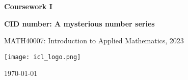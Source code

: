 \documentclass[10pt, a4paper]{article}
\begin{document}
\begin{titlepage}
    \begin{center}
        \vspace*{3cm}
            
        \Huge
        \textbf{
        Coursework I}
            
            
        \vspace{1.5cm}
        \Large
            
        \textbf{
        CID number: A mysterious number series}%
        
            
        \vfill
        
    MATH40007: Introduction to Applied Mathematics, 2023
        \vspace{1cm}
            
        \texttt{[image: icl\_logo.png]}
        \\
        
        \Large
        
        \today
            
    \end{center}
\end{titlepage}
\end{document}
